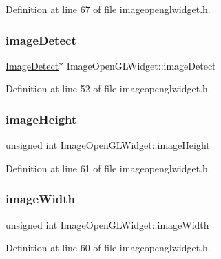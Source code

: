 Definition at line 67 of file imageopenglwidget.\+h.

\mbox{\label{class_image_open_g_l_widget_a33de4fe0a57b24dd5e0f0ea9b9c8a524}} 
\subsubsection{\texorpdfstring{imageDetect}{imageDetect}}
{\footnotesize\ttfamily \mbox{\hyperlink{class_image_detect}{Image\+Detect}}$\ast$ Image\+Open\+G\+L\+Widget\+::image\+Detect\hspace{0.3cm}{\ttfamily [protected]}}



Definition at line 52 of file imageopenglwidget.\+h.

\mbox{\label{class_image_open_g_l_widget_a30f0fce34d5d14972dce2c2d534aa692}} 
\subsubsection{\texorpdfstring{imageHeight}{imageHeight}}
{\footnotesize\ttfamily unsigned int Image\+Open\+G\+L\+Widget\+::image\+Height\hspace{0.3cm}{\ttfamily [protected]}}



Definition at line 61 of file imageopenglwidget.\+h.

\mbox{\label{class_image_open_g_l_widget_a8c3fbf15ba41c21741f8916079f5b6c3}} 
\subsubsection{\texorpdfstring{imageWidth}{imageWidth}}
{\footnotesize\ttfamily unsigned int Image\+Open\+G\+L\+Widget\+::image\+Width\hspace{0.3cm}{\ttfamily [protected]}}



Definition at line 60 of file imageopenglwidget.\+h.

